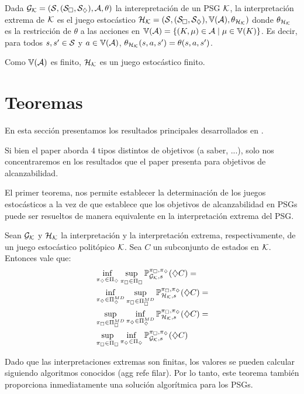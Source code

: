 \begin{definition}
	Dada $\mathcal{G}_{\mathcal{K}} = (\mathcal{S}, (\mathcal{S}_\square, \mathcal{S}_\diamondsuit), \mathcal{A}, \theta)$ la interepretación de un PSG $\mathcal{K}$, la interpretación extrema de $\mathcal{K}$ es el juego estocástico $\mathcal{H}_{\mathcal{K}} = (\mathcal{S}, (\mathcal{S}_\square, \mathcal{S}_\diamondsuit), \mathbb{V}(\mathcal{A}), \theta_{\mathcal{H}_{\mathcal{K}}})$ donde $\theta_{\mathcal{H}_{\mathcal{K}}}$ es la restricción de  $\theta$ a las acciones en $\mathbb{V}(\mathcal{A}) = \{(K, \mu) \in \mathcal{A} \mid \mu \in \mathbb{V}(K)\}$. Es decir, para todos $s, s' \in \mathcal{S}$ y $a \in \mathbb{V}(\mathcal{A})$, $\theta_{\mathcal{H}_{\mathcal{K}}}(s, a, s') = \theta(s, a, s')$.

	Como $\mathbb{V}(\mathcal{A})$ es finito, $\mathcal{H}_{\mathcal{K}}$ es un juego estocástico finito.
\end{definition}

\section{Teoremas}

En esta sección presentamos los resultados principales desarrollados en
\cite{Polytopal}.

Si bien el paper aborda 4 tipos distintos de objetivos (a saber, ...), solo nos
concentraremos en los resultados que el paper presenta para objetivos de
alcanzabilidad.

El primer teorema, nos permite establecer la determinación de los juegos
estocásticos a la vez de que establece que los objetivos de alcanzabilidad en
PSGs puede ser resueltos de manera equivalente en la interpretación extrema del
PSG.

\begin{theorem}
	Sean $\mathcal{G}_{\mathcal{K}}$ y $\mathcal{H}_{\mathcal{K}}$ la interpretación y la interpretación extrema, respectivamente, de un juego estocástico politópico $\mathcal{K}$. Sea $C$ un subconjunto de estados en $\mathcal{K}$. Entonces vale que:
	\begin{align*}
		&\inf_{\pi_\diamondsuit \in \Pi_\diamondsuit} \sup_{\pi_\square \in \Pi_\square} \mathbb{P}_{\mathcal{G}_{\mathcal{K}}, s}^{\pi_\square, \pi_\diamondsuit}(\diamondsuit C) = \\
		&\inf_{\pi_\diamondsuit \in \Pi_\diamondsuit^{MD}} \sup_{\pi_\square \in \Pi_\square^{MD}} \mathbb{P}_{\mathcal{H}_{\mathcal{K}}, s}^{\pi_\square, \pi_\diamondsuit}(\diamondsuit C) = \\
		&\sup_{\pi_\square \in \Pi_\square^{MD}} \inf_{\pi_\diamondsuit \in \Pi_\diamondsuit^{MD}} \mathbb{P}_{\mathcal{H}_{\mathcal{K}}, s}^{\pi_\square, \pi_\diamondsuit}(\diamondsuit C) = \\
		&\sup_{\pi_\square \in \Pi_\square} \inf_{\pi_\diamondsuit \in \Pi_\diamondsuit} \mathbb{P}_{\mathcal{G}_{\mathcal{K}}, s}^{\pi_\square, \pi_\diamondsuit}(\diamondsuit C)
	\end{align*}
\end{theorem}

Dado que las interpretaciones extremas son finitas, los valores se pueden
calcular siguiendo algoritmos conocidos \cite{CONDON1992} (agg refe filar). Por
lo tanto, este teorema también proporciona inmediatamente una solución
algorítmica para los PSGs.

